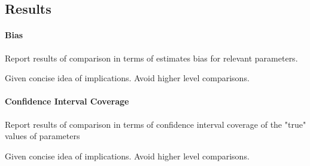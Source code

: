 \subsection{Results}
\paragraph{Bias}
	Report results of comparison in terms of estimates bias for relevant parameters.

	Given concise idea of implications. Avoid higher level comparisons.

\paragraph{Confidence Interval Coverage}
	Report results of comparison in terms of confidence interval coverage of the "true" values of parameters 

	Given concise idea of implications. Avoid higher level comparisons.
